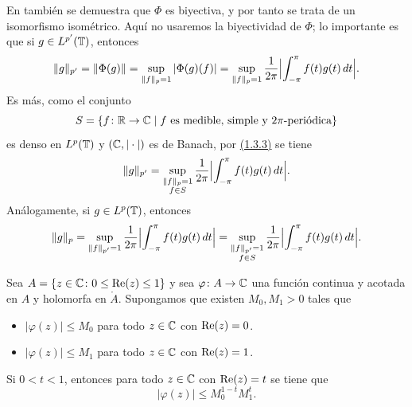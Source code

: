 \documentclass[a4paper, 12pt]{book}
\begin{document}
En \cite{folland} también se demuestra que $\Phi$ es biyectiva, y por tanto se trata de un isomorfismo isométrico. Aquí no usaremos la biyectividad de $\Phi$; lo importante es que si $g \in L^{p'}(\mathbb T)$, entonces
\[
    \|g\|_{p'} = \|\Phi(g)\| = \sup_{\|f\|_p = 1} |\Phi(g)(f)| = \sup_{\|f\|_p=1}\frac{1}{2\pi}\Bigl|\int_{-\pi}^{\pi} f(t)g(t) \, dt\Bigr|.
\]
Es más, como el conjunto 
\[S = \{f \colon \mathbb R \to \mathbb C \mid f \textup{ es medible, simple y } 2\pi \textup{-periódica}\}\]
es denso en $L^{p}(\mathbb T)$ y $(\mathbb C,|\cdot|)$ es de Banach, por \hyperref[1.3.3]{(1.3.3)} se tiene
\begin{equation*}
    \|g\|_{p'} = \sup_{\substack{\|f\|_{p}=1 \\ f \in S}}\frac{1}{2\pi}\Bigl|\int_{-\pi}^{\pi} f(t)g(t) \, dt\Bigr|.
\end{equation*}
Análogamente, si $g\in L^p(\mathbb T)$, entonces
\begin{equation}\label{3.2.2}
    \|g\|_{p} = \sup_{\|f\|_{p'}=1}\frac{1}{2\pi}\Bigl|\int_{-\pi}^{\pi} f(t)g(t) \, dt\Bigr| = \sup_{\substack{\|f\|_{p'}=1 \\ f \in S}}\frac{1}{2\pi}\Bigl|\int_{-\pi}^{\pi} f(t)g(t) \, dt\Bigr|.
\end{equation}

\begin{lemma}\label{3.2.3}
    Sea $A = \{z \in \mathbb C \colon 0 \leq \textup{Re}(z) \leq 1\}$ y sea $\varphi \colon A \to \mathbb C$ una función continua y acotada en $A$ y holomorfa en $\mathring{A}$. Supongamos que existen $M_0,M_1>0$ tales que
    \begin{itemize}
        \item $|\varphi(z)| \leq M_0$ para todo $z \in \mathbb C$ con $\textup{Re}(z) = 0$.
        \item $|\varphi(z)| \leq M_1$ para todo $z \in \mathbb C$ con $\textup{Re}(z) = 1$.
    \end{itemize}
    Si $0 < t < 1$, entonces para todo $z \in \mathbb C$ con $\textup{Re}(z) = t$ se tiene que
    \[|\varphi(z)| \leq M_0^{1-t}M_1^t.\]
\end{lemma}
\end{document}
